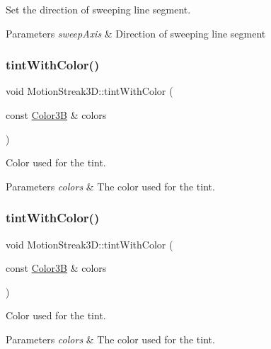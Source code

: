 Set the direction of sweeping line segment. 
\begin{DoxyParams}{Parameters}
{\em sweep\+Axis} & Direction of sweeping line segment \\
\hline
\end{DoxyParams}
\mbox{\label{classMotionStreak3D_a5c79a196ddadb3a869da49e3d501bb24}} 
\subsubsection{\texorpdfstring{tint\+With\+Color()}{tintWithColor()}\hspace{0.1cm}{\footnotesize\ttfamily [1/2]}}
{\footnotesize\ttfamily void Motion\+Streak3\+D\+::tint\+With\+Color (\begin{DoxyParamCaption}\item[{const \hyperlink{structColor3B}{Color3B} \&}]{colors }\end{DoxyParamCaption})}

Color used for the tint.


\begin{DoxyParams}{Parameters}
{\em colors} & The color used for the tint. \\
\hline
\end{DoxyParams}
\mbox{\label{classMotionStreak3D_a5c79a196ddadb3a869da49e3d501bb24}} 
\subsubsection{\texorpdfstring{tint\+With\+Color()}{tintWithColor()}\hspace{0.1cm}{\footnotesize\ttfamily [2/2]}}
{\footnotesize\ttfamily void Motion\+Streak3\+D\+::tint\+With\+Color (\begin{DoxyParamCaption}\item[{const \hyperlink{structColor3B}{Color3B} \&}]{colors }\end{DoxyParamCaption})}

Color used for the tint.


\begin{DoxyParams}{Parameters}
{\em colors} & The color used for the tint. \\
\hline
\end{DoxyParams}
\mbox{\label{classMotionStreak3D_a195dbdebb5c5d55d3d09c4e5dc716a91}} 
